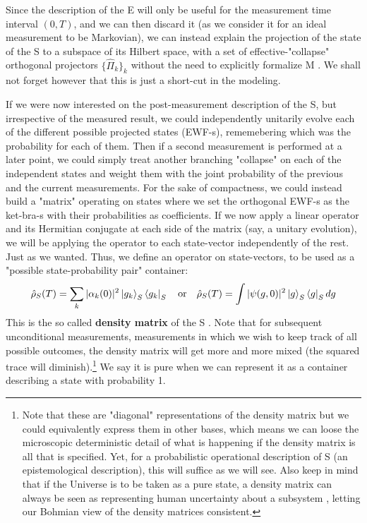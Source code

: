 \documentclass[11pt, a4paper]{article} %
\begin{document}
Since the description of the E will only be useful for the measurement time interval $(0,T)$, and we can then discard it (as we consider it for an ideal measurement to be Markovian), we can instead explain the projection of the state of the S to a subspace of its Hilbert space, with a set of effective-"collapse" orthogonal projectors $\{\hat{\Pi}_k\}_k$ without the need to explicitly formalize M \cite{Durr}. We shall not forget however that this is just a short-cut in the modeling.

If we were now interested on the post-measurement description of the S, but irrespective of the measured result, we could independently unitarily evolve each of the different possible projected states (EWF-s), rememebering which was the probability for each of them. Then if a second measurement is performed at a later point, we could simply treat another branching "collapse" on each of the independent states and weight them with the joint probability of the previous and the current measurements. For the sake of compactness, we could instead build a "matrix" operating on states where we set the orthogonal EWF-s as the ket-bra-s with their probabilities as coefficients. If we now apply a linear operator and its Hermitian conjugate at each side of the matrix (say, a unitary evolution), we will be applying the operator to each state-vector independently of the rest. Just as we wanted. Thus, we define an operator on state-vectors, to be used as a "possible state-probability pair" container:
\begin{equation}\label{dens}
\hat{\rho}_S(T) =\sum_k |\alpha_k(0)|^2\ket{g_k}_S\bra{g_k}_S \quad \text{or} \quad \hat{\rho}_S(T)=\int |\psi(g,0)|^2\ket{g}_S\bra{g}_S dg
\end{equation}
This is the so called {\bf density matrix} of the S \cite{vonNeumann, Durr, Holland}. Note that for subsequent unconditional measurements, measurements in which we wish to keep track of all possible outcomes, the density matrix will get more and more mixed (the squared trace will diminish).\footnote{Note that these are "diagonal" representations of the density matrix but we could equivalently express them in other bases, which means we can loose the microscopic deterministic detail of what is happening if the density matrix is all that is specified. Yet, for a probabilistic operational description of S (an epistemological description), this will suffice as we will see. Also keep in mind that if the Universe is to be taken as a pure state, a density matrix can always be seen as representing human uncertainty about a subsystem \cite{Generalized}, letting our Bohmian view of the density matrices consistent.} We say it is pure when we can represent it as a container describing a state with probability 1. 
\end{document}
